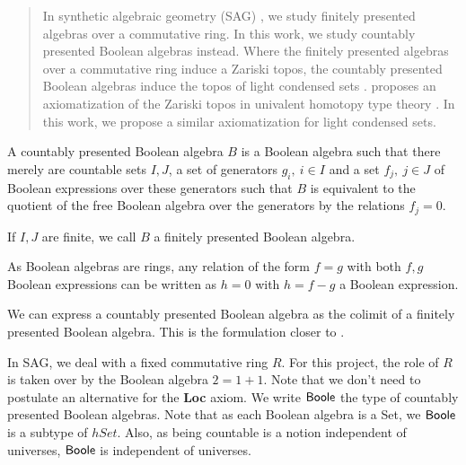 \begin{abstract}
In synthetic algebraic geometry (SAG) \cite{draft}, we study finitely presented algebras over a commutative ring. 
In this work, we study countably presented Boolean algebras instead. 
Where the finitely presented algebras over a commutative ring induce a Zariski topos, 
the countably presented Boolean algebras induce the topos of light condensed sets \cite{Scholze}. 
\cite{draft} proposes an axiomatization of the Zariski topos in univalent homotopy type theory \cite{HoTT}. 
In this work, we propose a similar axiomatization for light condensed sets. 
\end{abstract} 

\begin{definition}
  A countably presented Boolean algebra $B$ is a Boolean algebra such that there merely are 
  countable sets $I,J$, 
  a set of generators $g_i,~{i\in I}$ and a set $f_j,~{j\in J}$ of Boolean expressions over these generators 
  such that $B$ is equivalent to the quotient of the free Boolean algebra over the generators by the relations
  $f_j=0$. 
\end{definition} 
If $I,J$ are finite, we call $B$ a finitely presented Boolean algebra. 

\begin{remark}
  As Boolean algebras are rings, any relation of the form $f=g$ with both $f,g$ Boolean expressions 
  can be written as $h=0$ with $h=f-g$ a Boolean expression. 
\end{remark} 
We can express a countably presented Boolean algebra as the colimit of a finitely presented Boolean algebra. 
This is the formulation closer to \cite{Scholze}.



\medskip

In SAG, we deal with a fixed commutative ring $R$. For this project, the role of $R$ is taken over by 
the Boolean algebra $2 = 1+1$. Note that we don't need to postulate an alternative for the \textbf{Loc} axiom. 
We write $\mathsf{Boole}$ the type of countably presented Boolean algebras.
Note that as each Boolean algebra is a Set, we $\mathsf{Boole}$ is a subtype of $hSet$.
Also, as being countable is a notion independent of universes, $\mathsf{Boole}$ is independent of universes.

\medskip

